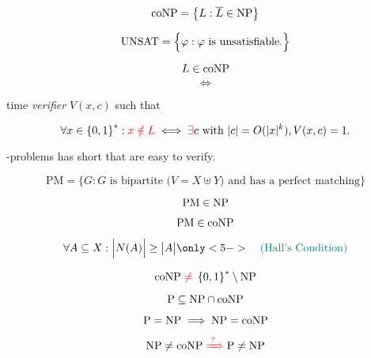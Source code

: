 
\begin{frame}
  \pause
  \[
	\text{coNP} = \left\{ L: \overline{L} \in \text{NP} \right\}
  \]

  \pause
  \[
	\text{UNSAT} = \Big\{ \varphi: \varphi \text{ is unsatisfiable.} \Big\}
  \]

  \pause
  \begin{definition}[\conp]
	\[
	  L \in \text{coNP}
	\]
	\[
	  \iff
	\]
	\begin{center}
	  \red{$\exists$}  time \emph{verifier} $V(x,c)$ such that
	\end{center}
	\pause 
	\[
	  \forall x \in \left\{ 0,1 \right\}^{\ast}: \textcolor{red}{x \notin L} \iff \textcolor{red}{\exists} c \text{ with } |c| = O(|x|^{k}), V(x,c) = 1.
	\]
  \end{definition}

  \pause
  \begin{center}
	{\large \conp-problems has short  that are easy to verify.}
  \end{center}
\end{frame}

\begin{frame}
  \[
	\text{PM} = \Big\{ G: G \text{ is bipartite ($V = X \uplus Y$) and has a perfect matching} \Big\}
  \]

  \pause
  \[
	\text{PM} \in \text{NP}
  \]

  \pause
  \[
	\text{PM} \in \text{coNP}
  \]

  \pause
  \[
	\forall A \subseteq X: \Big\lvert N(A) \Big\rvert \ge \big\lvert A \big\rvert \only<5->{\quad \text{\teal{(Hall's Condition)}}}
  \]
\end{frame}

\begin{frame}
  \[
	\text{coNP}{} \;\textcolor{red}{\neq}\; \left\{ 0,1 \right\}^{\ast} \setminus \text{NP}
  \]

  \pause
  \[
	\text{P} \subseteq \text{NP} \cap \text{coNP}
  \]

  \pause
  \[
	\text{P} = \text{NP} \implies \text{NP} = \text{coNP}
  \]

  \pause

  \pause
  \[
	\text{NP} \neq \text{coNP} \;\textcolor{red}{\xRightarrow{\;?\;}}\; \text{P} \neq \text{NP}
  \]
\end{frame}
